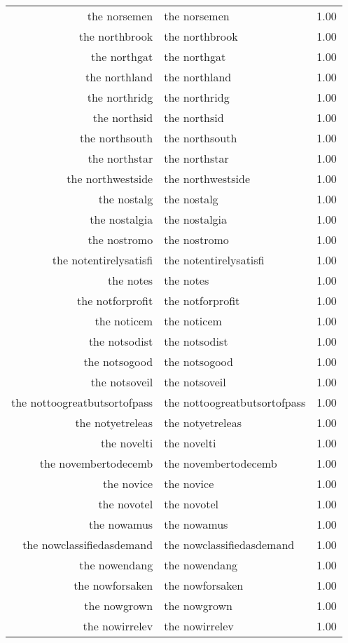 \begin{table}[ht]
\begin{tabular}{rlr}
  the norsemen & the norsemen & 1.00 \\ 
  the northbrook & the northbrook & 1.00 \\ 
  the northgat & the northgat & 1.00 \\ 
  the northland & the northland & 1.00 \\ 
  the northridg & the northridg & 1.00 \\ 
  the northsid & the northsid & 1.00 \\ 
  the northsouth & the northsouth & 1.00 \\ 
  the northstar & the northstar & 1.00 \\ 
  the northwestside & the northwestside & 1.00 \\ 
  the nostalg & the nostalg & 1.00 \\ 
  the nostalgia & the nostalgia & 1.00 \\ 
  the nostromo & the nostromo & 1.00 \\ 
  the notentirelysatisfi & the notentirelysatisfi & 1.00 \\ 
  the notes & the notes & 1.00 \\ 
  the notforprofit & the notforprofit & 1.00 \\ 
  the noticem & the noticem & 1.00 \\ 
  the notsodist & the notsodist & 1.00 \\ 
  the notsogood & the notsogood & 1.00 \\ 
  the notsoveil & the notsoveil & 1.00 \\ 
  the nottoogreatbutsortofpass & the nottoogreatbutsortofpass & 1.00 \\ 
  the notyetreleas & the notyetreleas & 1.00 \\ 
  the novelti & the novelti & 1.00 \\ 
  the novembertodecemb & the novembertodecemb & 1.00 \\ 
  the novice & the novice & 1.00 \\ 
  the novotel & the novotel & 1.00 \\ 
  the nowamus & the nowamus & 1.00 \\ 
  the nowclassifiedasdemand & the nowclassifiedasdemand & 1.00 \\ 
  the nowendang & the nowendang & 1.00 \\ 
  the nowforsaken & the nowforsaken & 1.00 \\ 
  the nowgrown & the nowgrown & 1.00 \\ 
  the nowirrelev & the nowirrelev & 1.00 \\ 

\end{tabular}
\end{table}
